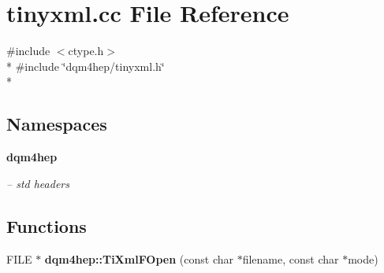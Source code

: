 \section{tinyxml.\+cc File Reference}
\label{tinyxml_8cc}
{\ttfamily \#include $<$ctype.\+h$>$}\\*
{\ttfamily \#include \char`\"{}dqm4hep/tinyxml.\+h\char`\"{}}\\*
\subsection*{Namespaces}
\begin{DoxyCompactItemize}
\item 
 {\bf dqm4hep}
\begin{DoxyCompactList}\small\item\em -- std headers \end{DoxyCompactList}\end{DoxyCompactItemize}
\subsection*{Functions}
\begin{DoxyCompactItemize}
\item 
F\+I\+L\+E $\ast$ {\bf dqm4hep\+::\+Ti\+Xml\+F\+Open} (const char $\ast$filename, const char $\ast$mode)
\end{DoxyCompactItemize}

